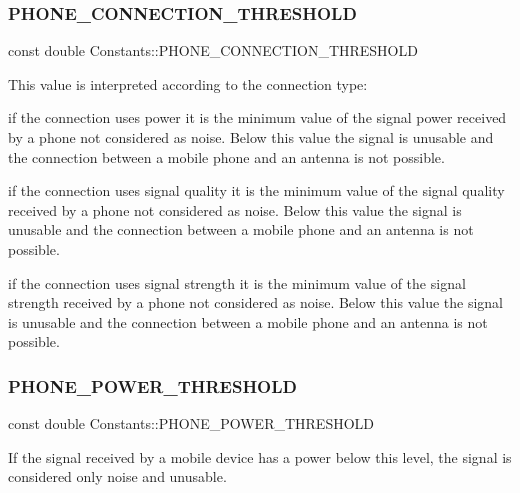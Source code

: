 \subsubsection{\texorpdfstring{P\+H\+O\+N\+E\+\_\+\+C\+O\+N\+N\+E\+C\+T\+I\+O\+N\+\_\+\+T\+H\+R\+E\+S\+H\+O\+LD}{PHONE\_CONNECTION\_THRESHOLD}}
{\footnotesize\ttfamily const double Constants\+::\+P\+H\+O\+N\+E\+\_\+\+C\+O\+N\+N\+E\+C\+T\+I\+O\+N\+\_\+\+T\+H\+R\+E\+S\+H\+O\+LD\hspace{0.3cm}{\ttfamily [static]}}

This value is interpreted according to the connection type\+:
\begin{DoxyItemize}
\item if the connection uses power it is the minimum value of the signal power received by a phone not considered as noise. Below this value the signal is unusable and the connection between a mobile phone and an antenna is not possible.
\item if the connection uses signal quality it is the minimum value of the signal quality received by a phone not considered as noise. Below this value the signal is unusable and the connection between a mobile phone and an antenna is not possible.
\item if the connection uses signal strength it is the minimum value of the signal strength received by a phone not considered as noise. Below this value the signal is unusable and the connection between a mobile phone and an antenna is not possible. 
\end{DoxyItemize}\mbox{\label{class_constants_a1e95cbdc2db02f6147ddf8ac61a428ab}} 
\subsubsection{\texorpdfstring{P\+H\+O\+N\+E\+\_\+\+P\+O\+W\+E\+R\+\_\+\+T\+H\+R\+E\+S\+H\+O\+LD}{PHONE\_POWER\_THRESHOLD}}
{\footnotesize\ttfamily const double Constants\+::\+P\+H\+O\+N\+E\+\_\+\+P\+O\+W\+E\+R\+\_\+\+T\+H\+R\+E\+S\+H\+O\+LD\hspace{0.3cm}{\ttfamily [static]}}

If the signal received by a mobile device has a power below this level, the signal is considered only noise and unusable. \mbox{\label{class_constants_a2c8a9d965bae29c19ff18c8b80260982}} 
